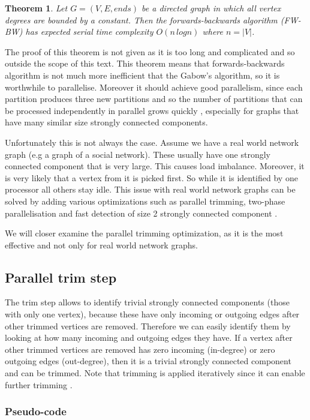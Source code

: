 \documentclass{report}
\theoremstyle{plain}
\newtheorem{theorem}{Theorem}
\theoremstyle{definition}
\theoremstyle{remark}
\numberwithin{definition}{chapter}
\numberwithin{example}{chapter}
\numberwithin{figure}{chapter}
\numberwithin{theorem}{chapter}
\numberwithin{lemma}{chapter}
\begin{document}
\begin{theorem}
Let $G=(V, E, ends)$ be a directed graph in which all vertex degrees are bounded by a constant. Then the forwards-backwards algorithm (FW-BW) has expected serial time complexity $O(n \, logn)$ where $n=|V|$.
\end{theorem}

The proof of this theorem is not given as it is too long and complicated and so outside the scope of this text. This theorem means that forwards-backwards algorithm is not much more inefficient that the Gabow's algorithm, so it is worthwhile to parallelise. Moreover it should achieve good parallelism, since each partition produces three new partitions and so the number of partitions that can be processed independently in parallel grows quickly \cite{hongtechnical}, especially for graphs that have many similar size strongly connected components.

Unfortunately this is not always the case. Assume we have a real world network graph (e.g a graph of a social network). These usually have one strongly connected component that is very large. This causes load imbalance. Moreover, it is very likely that a vertex from it is picked first. So while it is identified by one processor all others stay idle. This issue with real world network graphs can be solved by adding various optimizations such as parallel trimming, two-phase parallelisation and fast detection of size 2 strongly connected component \cite{hongtechnical}.

We will closer examine the parallel trimming optimization, as it is the most effective and not only for real world network graphs.

\subsection{Parallel trim step}

The trim step allows to identify trivial strongly connected components (those with only one vertex), because these have only incoming or outgoing edges after other trimmed vertices are removed. Therefore we can easily identify them by looking at how many incoming and outgoing edges they have. If a vertex after other trimmed vertices are removed has zero incoming (in-degree) or zero outgoing edges (out-degree), then it is a trivial strongly connected component and can be trimmed. Note that trimming is applied iteratively since it can enable further trimming \cite{hongtechnical}.

\subsubsection*{Pseudo-code}
\end{document}
